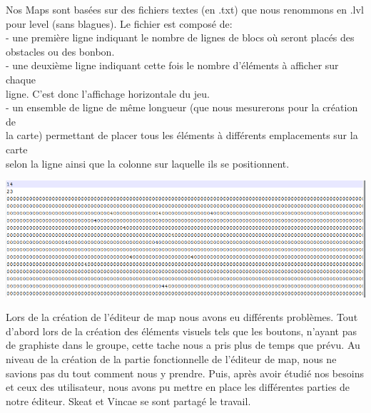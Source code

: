 \documentclass [11pt]{report}
\begin{document}
			
			
		\newpage
			
			
			
			Nos Maps sont basées sur des fichiers textes (en .txt) que nous renommons en .lvl pour level (sans blagues). Le fichier est composé de:\\
						
						\indent- une première ligne indiquant le nombre de lignes de blocs où seront placés des \\\indent obstacles ou des bonbon.\\
						
						\indent- une deuxième ligne indiquant cette fois le nombre d'éléments à afficher sur chaque\\\indent ligne. C'est donc l'affichage horizontale du jeu.\\
						
						\indent- un ensemble de ligne de même longueur (que nous mesurerons pour la création de \\\indent la carte) permettant de placer tous les éléments à différents emplacements sur la carte\\\indent selon la ligne ainsi que la colonne sur laquelle ils se positionnent.
						
						
						\vspace{10mm}
						
						\begin{center}
							\includegraphics[scale = 0.6]{images/lvl.png}
						\end{center}
						
						\vspace{10mm}
			
			
		
			 	
			 \indent Lors de la création de l'éditeur de map nous avons eu différents problèmes. Tout d'abord lors de la création des éléments visuels tels que les boutons, n'ayant pas de graphiste dans le groupe, cette tache nous a pris plus de temps que prévu. Au niveau de la création de la partie fonctionnelle de l'éditeur de map, nous ne savions pas du tout comment nous y prendre. Puis, après avoir étudié nos besoins et ceux des utilisateur, nous avons pu mettre en place les différentes parties de notre éditeur. Skeat et Vincae se sont partagé le travail.
			 
\end{document}
